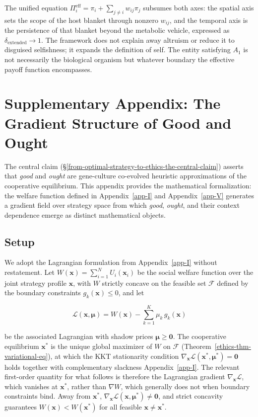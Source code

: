 \documentclass[11pt]{article}
\theoremstyle{plain}
\theoremstyle{definition}
\theoremstyle{remark}
\let\origsection\section
\renewcommand{\section}{\needspace{12\baselineskip}\origsection}
\let\origsubsection\subsection
\renewcommand{\subsection}{\needspace{7\baselineskip}\origsubsection}
\begin{document}
The unified equation
\(\Pi_i^{\text{eff}} = \pi_i + \sum_{j \neq i} w_{ij} \pi_j\) subsumes
both axes: the spatial axis sets the scope of the host blanket through
nonzero \(w_{ij}\), and the temporal axis is the persistence of that
blanket beyond the metabolic vehicle, expressed as
\(\delta_{\text{extended}} \to 1\). The framework does not explain away
altruism or reduce it to disguised selfishness; it expands the
definition of self. The entity satisfying \(A_1\) is not necessarily the
biological organism but whatever boundary the effective payoff function
encompasses.

\newpage

\section{Supplementary Appendix: The Gradient Structure of Good and
Ought}\label{supplementary-appendix-the-gradient-structure-of-good-and-ought}

The central claim
(§\ref{from-optimal-strategy-to-ethics-the-central-claim}) asserts that
\emph{good} and \emph{ought} are gene-culture co-evolved heuristic
approximations of the cooperative equilibrium. This appendix provides
the mathematical formalization: the welfare function defined in
Appendix~\ref{app-I} and Appendix~\ref{app-V} generates a gradient field
over strategy space from which \emph{good}, \emph{ought}, and their
context dependence emerge as distinct mathematical objects.

\subsection{Setup}\label{setup-2}

We adopt the Lagrangian formulation from Appendix~\ref{app-I} without
restatement. Let \(W(\mathbf{x}) = \sum_{i=1}^{N} U_i(\mathbf{x}_i)\) be
the social welfare function over the joint strategy profile
\(\mathbf{x}\), with \(W\) strictly concave on the feasible set
\(\mathcal{F}\) defined by the boundary constraints
\(g_k(\mathbf{x}) \leq 0\), and let

\[\mathcal{L}(\mathbf{x}, \boldsymbol{\mu}) = W(\mathbf{x}) - \sum_{k=1}^{K} \mu_k\, g_k(\mathbf{x})\]

be the associated Lagrangian with shadow prices
\(\boldsymbol{\mu} \geq \mathbf{0}\). The cooperative equilibrium
\(\mathbf{x}^*\) is the unique global maximizer of \(W\) on
\(\mathcal{F}\) (Theorem~\ref{ethics-thm-variational-eq}), at which the
KKT stationarity condition
\(\nabla_{\mathbf{x}} \mathcal{L}(\mathbf{x}^*, \boldsymbol{\mu}^*) = \mathbf{0}\)
holds together with complementary slackness Appendix~\ref{app-I}. The
relevant first-order quantity for what follows is therefore the
Lagrangian gradient \(\nabla_{\mathbf{x}} \mathcal{L}\), which vanishes
at \(\mathbf{x}^*\), rather than \(\nabla W\), which generally does not
when boundary constraints bind. Away from \(\mathbf{x}^*\),
\(\nabla_{\mathbf{x}} \mathcal{L}(\mathbf{x}, \boldsymbol{\mu}^*) \neq \mathbf{0}\),
and strict concavity guarantees \(W(\mathbf{x}) < W(\mathbf{x}^*)\) for
all feasible \(\mathbf{x} \neq \mathbf{x}^*\).
\end{document}
